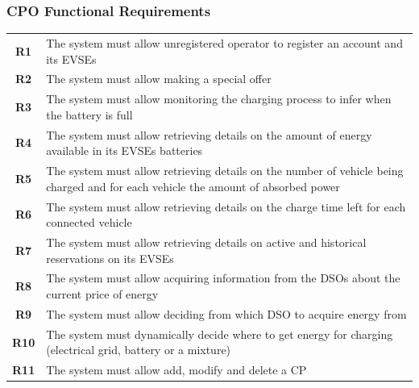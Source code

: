\subsubsection{CPO Functional Requirements}
\begin{table}[H]
    \begin{tabularx}{\textwidth}{cX}
        \toprule
        \textbf{R1}  & The system must allow unregistered operator to register an account and its EVSEs                                                  \\
        \textbf{R2}  & The system must allow making a special offer                                                                                      \\
        \textbf{R3}  & The system must allow monitoring the charging process to infer when the battery is full                                           \\
        \textbf{R4}  & The system must allow retrieving details on the amount of energy available in its EVSEs batteries                                 \\
        \textbf{R5}  & The system must allow retrieving details on the number of vehicle being charged and for each vehicle the amount of absorbed power \\
        \textbf{R6}  & The system must allow retrieving details on the charge time left for each connected vehicle                                       \\
        \textbf{R7}  & The system must allow retrieving details on active and historical reservations on its EVSEs                                       \\
        \textbf{R8}  & The system must allow acquiring information from the DSOs about the current price of energy                                       \\
        \textbf{R9}  & The system must allow deciding from which DSO to acquire energy from                                                              \\
        \textbf{R10} & The system must dynamically decide where to get energy for charging (electrical grid, battery or a mixture)                       \\
        \textbf{R11} & The system must allow add, modify and delete a CP                                                                                 \\
        \bottomrule
    \end{tabularx}
\end{table}
